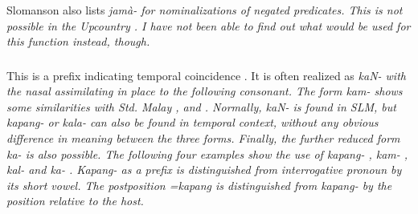 




Slomanson also lists \em jamà- \em for nominalizations of negated predicates. This is not possible  in the Upcountry . I have not been able to find out what would be used for this function instead, though.




 



\subsubsection{}\label{sec:morph:kapang-}
This is a   prefix indicating temporal coincidence \citep[cf.][]{Slomanson2008ismil} . It is often realized as \em kaN- \em with the nasal assimilating in place to the following consonant. The form \em kam- \em shows some similarities with Std. Malay , and  . Normally, \em kaN- \em is found in SLM, but \em kapang- \em or  \em kala- \em can also be found in temporal context, without any obvious difference in meaning between the three forms. Finally, the further reduced form \em ka- \em is also possible. The following four examples show the use of \em kapang- , kam- , kal-  \em and \em ka- \em {}.  \em Kapang- \em as a prefix is distinguished from interrogative pronoun   by its short vowel. The postposition \em =kapang \em {} is distinguished from \em kapang- \em by the position relative to the host.


